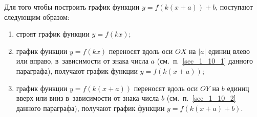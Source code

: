 \begin{figure}\label{fig_1_10_34}
\end{figure}

Для того чтобы построить график функции $y = f(k(x + a)) + b$,
поступают следующим образом:
\begin{enumerate}
\item строят график функции $y = f(kx)$;
\item график функции $y = f(kx)$ переносят вдоль оси $OX$ на $|a|$ единиц
влево или вправо, в~зависимости от знака числа $a$
(см.\ п.~\ref{sec_1_10_1} данного параграфа), получают график функции $y = f(k(x+a))$;
\item график функции $y = f(k(x+a))$ переносят вдоль оси $OY$ на $b$
единиц вверх или вниз в~зависимости от знака числа $b$
(см.~п.~\ref{sec_1_10_2} данного параграфа), получают график функции
$y = f(k(x+a) + b)$.
\end{enumerate}

